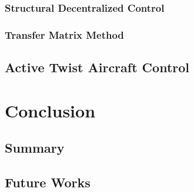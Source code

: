 \documentclass[11pt]{ucthesis}
\begin{document}
\subsection{Structural Decentralized Control}
\subsection{Transfer Matrix Method}

\section{Active Twist Aircraft Control}

\chapter{Conclusion}
\section{Summary}
\section{Future Works}

\nocite{*}


\end{document}

